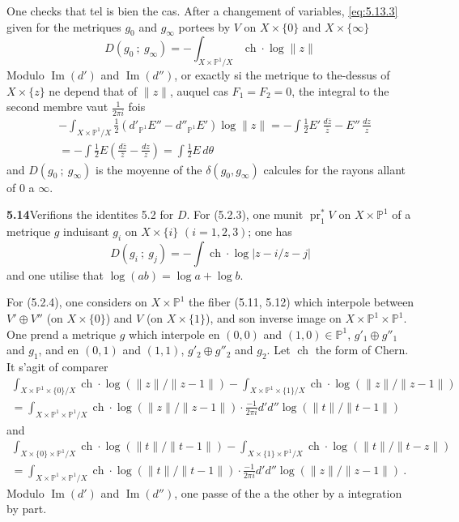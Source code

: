 \documentclass[12pt,a4paper]{article}
\theoremstyle{plain}
\theoremstyle{definition}
\theoremstyle{remark}
\DeclareMathOperator{\ch}{ch}
\DeclareMathOperator{\Imagem}{Im}
\newcommand{\bbP}{\mathbb{P}}
\DeclareMathOperator{\pr}{pr}
\begin{document}
One checks that tel is bien the cas. After a changement of variables, \eqref{eq:5.13.3} given for the metriques $g_0$ and $g_\infty$ portees by $V$ on $X \times \{0\}$ and $X \times \{\infty\}$
\[
D(g_0 \ ; \ g_\infty) = -\int_{X \times \bbP^1/X} \ch \cdot \log \|z\|
\]
Modulo $\Imagem(d')$ and $\Imagem(d'')$, or exactly si the metrique to the-dessus of $X \times \{z\}$ ne depend that of $\|z\|$, auquel cas $F_1 = F_2 = 0$, the integral to the second membre vaut $\frac{1}{2\pi i}$ fois
\begin{align*}
&-\int_{X \times \bbP^1/X} \tfrac{1}{2}(d'_{\bbP^1}E'' - d''_{\bbP^1}E') \log \|z\| = -\int \tfrac{1}{2} E' \, \frac{d\bar z}{\bar z} - E'' \, \frac{dz}{z} \\
&= -\int \tfrac{1}{2} E \left(\frac{d\bar z}{\bar z} - \frac{dz}{z}\right) = \int \tfrac{1}{2} E \, d\theta
\end{align*}
and $D(g_0 \ ; \ g_\infty)$ is the moyenne of the $\delta(g_0, g_\infty)$ calcules for the rayons allant of $0$ a $\infty$.

\medskip
\noindent\textbf{5.14}\quad Verifions the identites 5.2 for $D$. For (5.2.3), one munit $\pr_1^*V$ on $X \times \bbP^1$ of a metrique $g$ induisant $g_i$ on $X \times \{i\}$ $(i = 1,2,3)$; one has
\[
D(g_i \ ; \ g_j) = -\int \ch \cdot \log|z-i/z-j|
\]
and one utilise that $\log(ab) = \log a + \log b$.

For (5.2.4), one considers on $X \times \bbP^1$ the fiber (5.11, 5.12) which interpole between $V' \oplus V''$ (on $X \times \{0\}$) and $V$ (on $X \times \{1\}$), and son inverse image on $X \times \bbP^1 \times \bbP^1$. One prend a metrique $g$ which interpole en $(0,0)$ and $(1,0) \in \bbP^1$, $g'_1 \oplus g''_1$ and $g_1$, and en $(0,1)$ and $(1,1)$, $g'_2 \oplus g''_2$ and $g_2$. Let $\ch$ the form of Chern. It s'agit of comparer
\begin{multline*}
\int_{X \times \bbP^1 \times \{0\}/X} \ch \cdot \log(\|z\|/\|z-1\|) - \int_{X \times \bbP^1 \times \{1\}/X} \ch \cdot \log(\|z\|/\|z-1\|) \\
= \int_{X \times \bbP^1 \times \bbP^1/X} \ch \cdot \log(\|z\|/\|z-1\|) \cdot \frac{-1}{2\pi i} d'd'' \log(\|t\|/\|t-1\|)
\end{multline*}
and
\begin{multline*}
\int_{X \times \{0\} \times \bbP^1/X} \ch \cdot \log(\|t\|/\|t-1\|) - \int_{X \times \{1\} \times \bbP^1/X} \ch \cdot \log(\|t\|/\|t-z\|) \\
= \int_{X \times \bbP^1 \times \bbP^1/X} \ch \cdot \log(\|t\|/\|t-1\|) \cdot \frac{-1}{2\pi i} d'd'' \log(\|z\|/\|z-1\|) \ .
\end{multline*}
Modulo $\Imagem(d')$ and $\Imagem(d'')$, one passe of the a the other by a integration by part.
\end{document}
